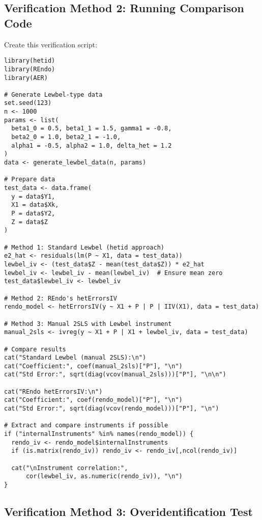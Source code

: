 \documentclass[12pt]{article}
\begin{document}
\subsection{Verification Method 2: Running Comparison Code}

Create this verification script:

\begin{lstlisting}[caption={Verification script: verify\_implementations.R}]
library(hetid)
library(REndo)
library(AER)

# Generate Lewbel-type data
set.seed(123)
n <- 1000
params <- list(
  beta1_0 = 0.5, beta1_1 = 1.5, gamma1 = -0.8,
  beta2_0 = 1.0, beta2_1 = -1.0,
  alpha1 = -0.5, alpha2 = 1.0, delta_het = 1.2
)
data <- generate_lewbel_data(n, params)

# Prepare data
test_data <- data.frame(
  y = data$Y1,
  X1 = data$Xk,
  P = data$Y2,
  Z = data$Z
)

# Method 1: Standard Lewbel (hetid approach)
e2_hat <- residuals(lm(P ~ X1, data = test_data))
lewbel_iv <- (test_data$Z - mean(test_data$Z)) * e2_hat
lewbel_iv <- lewbel_iv - mean(lewbel_iv)  # Ensure mean zero
test_data$lewbel_iv <- lewbel_iv

# Method 2: REndo's hetErrorsIV
rendo_model <- hetErrorsIV(y ~ X1 + P | P | IIV(X1), data = test_data)

# Method 3: Manual 2SLS with Lewbel instrument
manual_2sls <- ivreg(y ~ X1 + P | X1 + lewbel_iv, data = test_data)

# Compare results
cat("Standard Lewbel (manual 2SLS):\n")
cat("Coefficient:", coef(manual_2sls)["P"], "\n")
cat("Std Error:", sqrt(diag(vcov(manual_2sls)))["P"], "\n\n")

cat("REndo hetErrorsIV:\n")
cat("Coefficient:", coef(rendo_model)["P"], "\n")
cat("Std Error:", sqrt(diag(vcov(rendo_model)))["P"], "\n")

# Extract and compare instruments if possible
if ("internalInstruments" %in% names(rendo_model)) {
  rendo_iv <- rendo_model$internalInstruments
  if (is.matrix(rendo_iv)) rendo_iv <- rendo_iv[,ncol(rendo_iv)]
  
  cat("\nInstrument correlation:", 
      cor(lewbel_iv, as.numeric(rendo_iv)), "\n")
}
\end{lstlisting}

\subsection{Verification Method 3: Overidentification Test}
\end{document}
